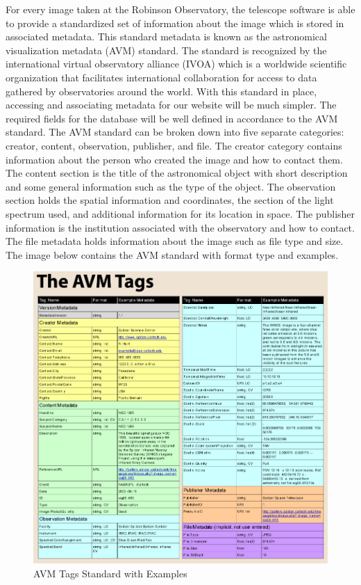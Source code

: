 \documentclass[12pt]{report}
\begin{document}
\begin{enumerate}
For every image taken at the Robinson Observatory, the telescope software is able to provide a standardized set of information about the image which is stored in associated metadata.  This standard metadata is known as the astronomical visualization metadata (AVM) standard.  The standard is recognized by the international virtual observatory alliance (IVOA) which is a worldwide scientific organization that facilitates international collaboration for access to data gathered by observatories around the world.  With this standard in place, accessing and associating metadata for our website will be much simpler.  The required fields for the database will be well defined in accordance to the AVM standard.
The AVM standard can be broken down into five separate categories: creator, content, observation, publisher, and file.  The creator category contains information about the person who created the image and how to contact them.  The content section is the title of the astronomical object with short description and some general information such as the type of the object.  The observation section holds the spatial information and coordinates, the section of the light spectrum used, and additional information for its location in space.  The publisher information is the institution associated with the observatory and how to contact.  The file metadata holds information about the image such as file type and size.
The image below contains the AVM standard with format type and examples.

\newpage

\begin{figure}[h]
	\centering
	\includegraphics[width=\linewidth]{avm_standards}
	\caption{AVM Tags Standard with Examples}
	\label{fig:AVM Standards}
\end{figure}


\end{enumerate}
\end{document}
